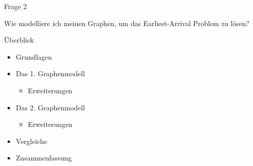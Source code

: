 \begin{frame}{Frage 2}
	\vspace{6em}
	\begin{center}
		\begin{Large}
			Wie modelliere ich meinen Graphen, um das Earliest-Arrival Problem zu lösen?
		\end{Large}
	\end{center}
\end{frame}


\begin{frame}{Überblick}
	\begin{itemize}
		\item Grundlagen
	\end{itemize}
	\vspace{1em}
	\begin{itemize}
		\item Das 1. Graphenmodell
		\begin{itemize}
			\item Erweiterungen
		\end{itemize}
	\end{itemize}
	\vspace{1em}
	\begin{itemize}
		\item Das 2. Graphenmodell
		\begin{itemize}
			\item Erweiterungen
		\end{itemize}
	\end{itemize}
	\vspace{1em}
	\begin{itemize}
		\item Vergleiche
	\end{itemize}
	\vspace{1em}
	\begin{itemize}
		\item Zusammenfassung
	\end{itemize}
\end{frame}



